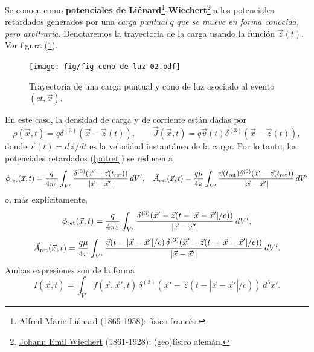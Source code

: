 Se conoce como \textbf{potenciales de Liénard}\footnote{\href{https://en.wikipedia.org/wiki/Alfred-Marie_Li\%C3\%A9nard}{Alfred Marie Liénard} (1869-1958): físico francés.}\textbf{-Wiechert}\footnote{\href{https://en.wikipedia.org/wiki/Emil_Wiechert}{Johann Emil Wiechert} (1861-1928): (geo)físico alemán.} a los potenciales retardados generados por una \textit{carga puntual} $q$ \textit{que se mueve en forma conocida, pero arbitraria}. Denotaremos la trayectoria de la carga usando la función $\vec{z}(t)$. Ver figura (\ref{fig:LW}).
\begin{figure}[ht]
\centerline{\texttt{[image: fig/fig-cono-de-luz-02.pdf]}}
\caption{Trayectoria de una carga puntual y cono de luz asociado al evento $(ct,\vec{x})$.}
\label{fig:LW}
\end{figure}
En este caso, la densidad de carga y de corriente están dadas por
\begin{equation}
\rho(\vec{x},t)=q\delta^{(3)}(\vec{x}-\vec{z}(t)), \qquad
\vec{J}(\vec{x},t)=q\vec{v}(t)\delta^{(3)}(\vec{x}-\vec{z}(t)),
\end{equation}
donde $\vec{v}(t)={d\vec{z}}/{dt}$ es la velocidad instantánea de la carga. Por lo tanto, los potenciales retardados (\ref{potret}) se reducen a
\begin{equation}
\phi_{\rm ret}(\vec{x},t)=\frac{q}{4\pi\varepsilon}\int_{V'}
\frac{\delta^{(3)}(\vec{x}'-\vec{z}(t_{\rm ret}))}{|\vec{x}-\vec{x}'|}\,dV', \quad
\vec{A}_{\rm ret}(\vec{x},t)=\frac{q\mu}{4\pi}\int_{V'}
\frac{\vec{v}(t_{\rm ret})\delta^{(3)}(\vec{x}'-\vec{z}(t_{\rm ret}))}{|\vec{x}-\vec{x}'|}\,dV'  \label{potretq1}
\end{equation}
o, más explícitamente,
\begin{equation}
\phi_{\rm ret}(\vec{x},t)=\frac{q}{4\pi\varepsilon}\int_{V'}
\frac{\delta^{(3)}(\vec{x}'-\vec{z}(t-|\vec{x}-\vec{x}'|/c))}{|\vec{x}-\vec{x}'|}\,dV', \end{equation}
\begin{equation}
\vec{A}_{\rm ret}(\vec{x},t)=\frac{q\mu}{4\pi}\int_{V'}
\frac{\vec{v}(t-|\vec{x}-\vec{x}'|/c)\,\delta^{(3)}(\vec{x}'-\vec{z}(t-|\vec{x}-\vec{x}'|/c))}{|\vec{x}-\vec{x}'|}\,dV' . \label{potretq2}
\end{equation}
Ambas expresiones son de la forma
\begin{equation}
I(\vec{x},t)=\int_{V'}
f(\vec{x},\vec{x}',t)\,\delta^{(3)}(\vec{x}'-\vec{z}(t-|\vec{x}-\vec{x}'|/c))\,d^3x' . \label{potretqg1}
\end{equation}

